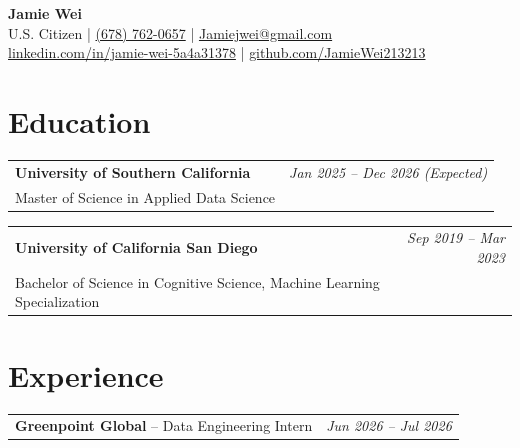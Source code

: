 \documentclass[10pt, letterpaper]{article}
\begin{document}

\begin{center}
    {\Huge\textbf{Jamie Wei}}\\[4pt]
    U.S. Citizen
    \quad|\quad
    \href{tel:+16787620657}{(678) 762-0657}
    \quad|\quad
    \href{mailto:Jamiejwei@gmail.com}{Jamiejwei@gmail.com}\\[3pt]
    \href{https://www.linkedin.com/in/jamie-wei-5a4a31378/}
        {linkedin.com/in/jamie-wei-5a4a31378}
    \quad|\quad
    \href{https://github.com/JamieWei213213}
        {github.com/JamieWei213213}
\end{center}


\section{Education}

\begin{tabularx}{\textwidth}{Xr}
    \textbf{University of Southern California}
        & \textit{Jan 2025 -- Dec 2026 (Expected)}\\
    Master of Science in Applied Data Science & \\
\end{tabularx}

\vspace{0.08cm}

\begin{tabularx}{\textwidth}{Xr}
    \textbf{University of California San Diego}
        & \textit{Sep 2019 -- Mar 2023}\\
    Bachelor of Science in Cognitive Science,
    Machine Learning Specialization & \\
\end{tabularx}


\section{Experience}

\begin{tabularx}{\textwidth}{Xr}
    \textbf{Greenpoint Global} -- Data Engineering Intern
        & \textit{Jun 2026 -- Jul 2026}
\end{tabularx}
\end{document}
